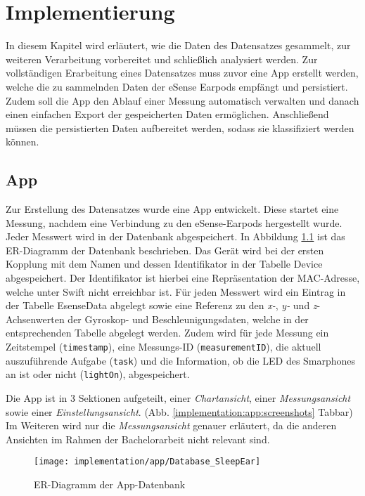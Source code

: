 \chapter{Implementierung}
\label{ch:Implementierung}

In diesem Kapitel wird erläutert, wie die Daten des Datensatzes gesammelt, zur weiteren Verarbeitung vorbereitet und schließlich analysiert werden.
Zur vollständigen Erarbeitung eines Datensatzes muss zuvor eine App erstellt werden, welche die zu sammelnden Daten der eSense Earpods empfängt und persistiert. 
Zudem soll die App den Ablauf einer Messung automatisch verwalten und danach einen einfachen Export der gespeicherten Daten ermöglichen.
Anschließend müssen die persistierten Daten aufbereitet werden, sodass sie klassifiziert werden können.

\section{App}
\label{ch:Implementierung:app}
Zur Erstellung des Datensatzes wurde eine App entwickelt.
Diese startet eine Messung, nachdem eine Verbindung zu den eSense-Earpods hergestellt wurde.
Jeder Messwert wird in der Datenbank abgespeichert.
In Abbildung \ref{implementation:app:erModel} ist das ER-Diagramm der Datenbank beschrieben.
Das Gerät wird bei der ersten Kopplung mit dem Namen und dessen Identifikator in der Tabelle {\glqq Device\grqq} abgespeichert.
Der Identifikator ist hierbei eine Repräsentation der MAC-Adresse, welche unter Swift nicht erreichbar ist.
Für jeden Messwert wird ein Eintrag in der Tabelle {\glqq EsenseData\grqq} abgelegt sowie eine Referenz zu den \textit{x-}, \textit{y-} und \textit{z}-Achsenwerten der Gyroskop- und Beschleunigungsdaten, welche in der entsprechenden Tabelle abgelegt werden.
Zudem wird für jede Messung ein Zeitstempel (\texttt{timestamp}), eine Messungs-ID (\texttt{measurementID}), die aktuell auszuführende Aufgabe (\texttt{task}) und die Information, ob die LED des Smarphones an ist oder nicht (\texttt{lightOn}), abgespeichert.

Die App ist in 3 Sektionen aufgeteilt, einer \textit{Chartansicht}, einer \textit{Messungsansicht} sowie einer \textit{Einstellungsansicht}. 
(Abb. \ref{implementation:app:screenshots} Tabbar)
Im Weiteren wird nur die \textit{Messungsansicht} genauer erläutert, da die anderen Ansichten im Rahmen der Bachelorarbeit nicht relevant sind.

\begin{figure}[ht]
  \centering
  \texttt{[image: implementation/app/Database\_SleepEar]}
  \caption{ER-Diagramm der App-Datenbank}
  \label{implementation:app:erModel}
\end{figure}

